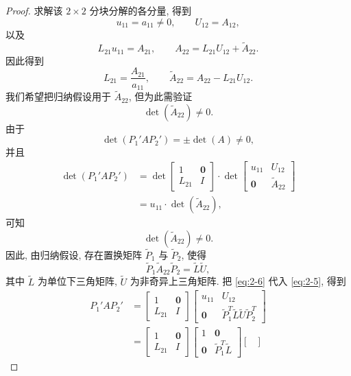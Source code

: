 \begin{proof}
求解该 $2\times2$ 分块分解的各分量, 得到
\[
  u_{11}=a_{11}\neq0,\qquad U_{12}=A_{12},
\]
以及
\[
  L_{21}u_{11}=A_{21},\qquad A_{22}=L_{21}U_{12}+\widetilde{A}_{22}.
\]
因此得到
\[
  L_{21}=\frac{A_{21}}{a_{11}},\qquad
  \widetilde{A}_{22}=A_{22}-L_{21}U_{12}.
\]
我们希望把归纳假设用于 $\widetilde{A}_{22}$, 但为此需验证
\[
  \det(\widetilde{A}_{22})\neq0.
\]
由于
\[
  \det(P_1'AP_2')=\pm\det(A)\neq0,
\]
并且
\[
  \begin{aligned}
    \det(P_1'AP_2')
    &=\det
    \begin{bmatrix}
      1      & \mathbf{0}\\
      L_{21} & I
    \end{bmatrix}\cdot
    \det
    \begin{bmatrix}
      u_{11} & U_{12}\\
      \mathbf{0} & \widetilde{A}_{22}
    \end{bmatrix}\\
    &=u_{11}\cdot\det(\widetilde{A}_{22}),
  \end{aligned}
\]
可知
\[
  \det(\widetilde{A}_{22})\neq0.
\]
因此, 由归纳假设, 存在置换矩阵 $\widetilde{P}_1$ 与 $\widetilde{P}_2$, 使得
\begin{equation}
  \widetilde{P}_1\widetilde{A}_{22}\widetilde{P}_2=\widetilde{L}\widetilde{U},
  \label{eq:2-6}
\end{equation}
其中 $\widetilde{L}$ 为单位下三角矩阵, $\widetilde{U}$ 为非奇异上三角矩阵. 把 \eqref{eq:2-6} 代入 \eqref{eq:2-5}, 得到
\[
  \begin{aligned}
    P_1'AP_2'
    &=
    \begin{bmatrix}
      1      & \mathbf{0}\\
      L_{21} & I
    \end{bmatrix}
    \begin{bmatrix}
      u_{11} & U_{12}\\
      \mathbf{0} & \widetilde{P}_1^T\widetilde{L}\widetilde{U}\widetilde{P}_2^T
    \end{bmatrix}\\
    &=
    \begin{bmatrix}
      1      & \mathbf{0}\\
      L_{21} & I
    \end{bmatrix}
    \begin{bmatrix}
      1      & \mathbf{0}\\
      \mathbf{0} & \widetilde{P}_1^T\widetilde{L}
    \end{bmatrix}
    \begin{bmatrix}

\end{bmatrix}
\end{aligned}\]
\end{proof}
